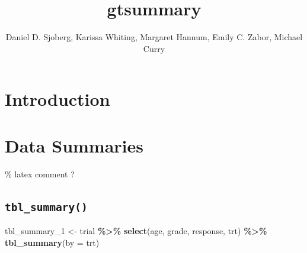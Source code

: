\documentclass[
]{article}
\title{gtsummary}
\author{Daniel D. Sjoberg, Karissa Whiting, Margaret Hannum, Emily C.
Zabor, Michael Curry}
\date{}
\newenvironment{Shaded}{\begin{snugshade}}{\end{snugshade}}
\newcommand{\DataTypeTok}[1]{\textcolor[rgb]{0.13,0.29,0.53}{#1}}
\newcommand{\DecValTok}[1]{\textcolor[rgb]{0.00,0.00,0.81}{#1}}
\newcommand{\KeywordTok}[1]{\textcolor[rgb]{0.13,0.29,0.53}{\textbf{#1}}}
\newcommand{\NormalTok}[1]{#1}
\newcommand{\OperatorTok}[1]{\textcolor[rgb]{0.81,0.36,0.00}{\textbf{#1}}}
\newcommand{\StringTok}[1]{\textcolor[rgb]{0.31,0.60,0.02}{#1}}
\begin{document}
\maketitle

\hypertarget{introduction}{%
\section{Introduction}\label{introduction}}

\hypertarget{data-summaries}{%
\section{Data Summaries}\label{data-summaries}}

\% latex comment ?

\hypertarget{tbl_summary}{%
\subsection{\texorpdfstring{\texttt{tbl\_summary()}}{tbl\_summary()}}\label{tbl_summary}}

\begin{Shaded}
\begin{Highlighting}[]
\NormalTok{tbl\_summary\_}\DecValTok{1}\NormalTok{ <{-}}
\StringTok{  }\NormalTok{trial }\OperatorTok{\%>\%}
\StringTok{  }\KeywordTok{select}\NormalTok{(age, grade, response, trt) }\OperatorTok{\%>\%}
\StringTok{  }\KeywordTok{tbl\_summary}\NormalTok{(}\DataTypeTok{by =}\NormalTok{ trt)}
\end{Highlighting}
\end{Shaded}
\end{document}
